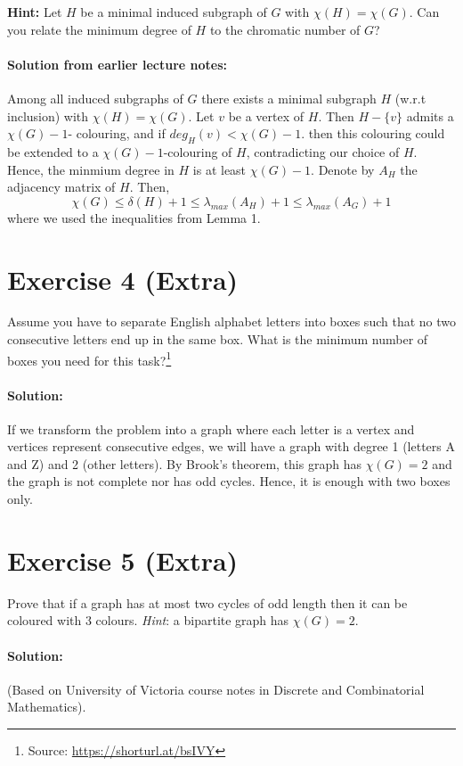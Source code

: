\documentclass{article}
\begin{document}
\textbf{Hint:} Let $H$ be a minimal induced subgraph of $G$ with $\chi(H) = \chi(G)$. Can you relate the minimum degree of $H$ to the chromatic number of $G$?
  
\paragraph{Solution from earlier lecture notes:} Among all induced subgraphs of $G$ there exists a minimal subgraph $H$ (w.r.t inclusion) with $\chi(H)= \chi(G)$. Let $v$ be a vertex of $H$. Then $H - \{v\}$ admits a $\chi(G) - 1$- colouring, and if $deg_{H}(v) < \chi(G) - 1$. then this colouring could be extended to a $\chi(G) - 1$-colouring of $H$, contradicting our choice of $H$. Hence, the minmium degree in $H$ is at least $\chi(G) - 1$. Denote by $A_{H}$ the adjacency matrix of $H$. Then, 
$$\chi(G) \leq \delta(H) + 1 \leq \lambda_{max}(A_{H}) + 1\leq \lambda_{max}(A_{G}) + 1$$
where we used the inequalities from Lemma 1.

\section*{Exercise 4 (Extra)}
Assume you have to separate English alphabet letters into boxes such that no two consecutive letters end up in the same box. What is the minimum number of boxes you need for this task?\footnote{
  Source: \url{https://shorturl.at/bsIVY}
}

\paragraph{Solution:}
If we transform the problem into a graph where each letter is a vertex and vertices represent consecutive edges, we will have a graph with degree 1 (letters A and Z) and 2 (other letters). By Brook's theorem, this graph has $\chi(G) = 2$ and the graph is not complete nor has odd cycles. Hence, it is enough with two boxes only.

\section*{Exercise 5 (Extra)}
Prove that if a graph has at most two cycles of odd length then it can be coloured with 3 colours. \textit{Hint}: a bipartite graph has $\chi(G) = 2$.

\paragraph{Solution:}
(Based on University of Victoria course notes in Discrete and Combinatorial Mathematics).
\end{document}
